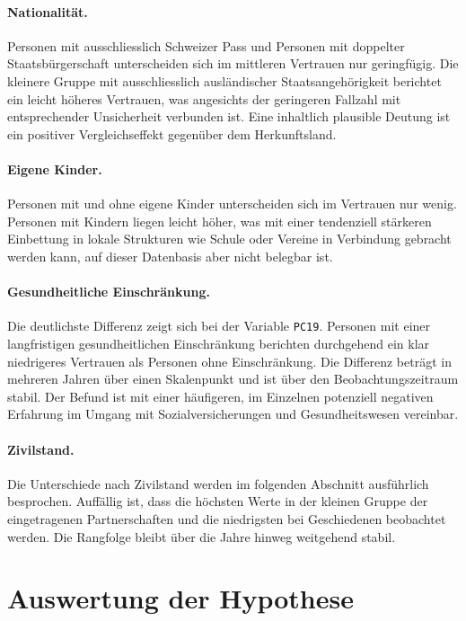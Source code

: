 \paragraph{Nationalität.}
Personen mit ausschliesslich Schweizer Pass und Personen mit doppelter
Staatsbürgerschaft unterscheiden sich im mittleren Vertrauen nur geringfügig. Die
kleinere Gruppe mit ausschliesslich ausländischer Staatsangehörigkeit berichtet ein
leicht höheres Vertrauen, was angesichts der geringeren Fallzahl mit entsprechender
Unsicherheit verbunden ist. Eine inhaltlich plausible Deutung ist ein positiver
Vergleichseffekt gegenüber dem Herkunftsland.

\paragraph{Eigene Kinder.}
Personen mit und ohne eigene Kinder unterscheiden sich im Vertrauen nur wenig. Personen
mit Kindern liegen leicht höher, was mit einer tendenziell stärkeren Einbettung in
lokale Strukturen wie Schule oder Vereine in Verbindung gebracht werden kann, auf
dieser Datenbasis aber nicht belegbar ist.

\paragraph{Gesundheitliche Einschränkung.}
Die deutlichste Differenz zeigt sich bei der Variable \texttt{PC19}. Personen mit einer
langfristigen gesundheitlichen Einschränkung berichten durchgehend ein klar niedrigeres
Vertrauen als Personen ohne Einschränkung. Die Differenz beträgt in mehreren Jahren
über einen Skalenpunkt und ist über den Beobachtungszeitraum stabil. Der Befund ist mit
einer häufigeren, im Einzelnen potenziell negativen Erfahrung im Umgang mit
Sozialversicherungen und Gesundheitswesen vereinbar.

\paragraph{Zivilstand.}
Die Unterschiede nach Zivilstand werden im folgenden Abschnitt ausführlich besprochen.
Auffällig ist, dass die höchsten Werte in der kleinen Gruppe der eingetragenen
Partnerschaften und die niedrigsten bei Geschiedenen beobachtet werden. Die Rangfolge
bleibt über die Jahre hinweg weitgehend stabil.



\section{Auswertung der Hypothese}
\label{sec:hypothesenauswertung}

